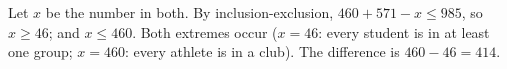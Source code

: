 Let $x$ be the number in both. By inclusion-exclusion, $460+571-x\le985$, so $x\ge46$; and $x\le460$. Both extremes occur ($x=46$: every student is in at least one group; $x=460$: every athlete is in a club). The difference is $460-46=\boxed{414}$.
